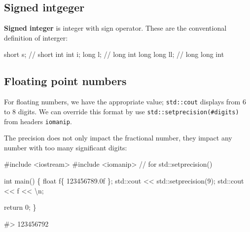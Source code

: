 \documentclass[
  letterpaper,
  DIV=11,
  numbers=noendperiod]{scrreprt}
\newenvironment{Shaded}{\begin{snugshade}}{\end{snugshade}}
\newcommand{\CommentTok}[1]{\textcolor[rgb]{0.37,0.37,0.37}{#1}}
\newcommand{\DecValTok}[1]{\textcolor[rgb]{0.68,0.00,0.00}{#1}}
\newcommand{\ErrorTok}[1]{\textcolor[rgb]{0.68,0.00,0.00}{#1}}
\newcommand{\FloatTok}[1]{\textcolor[rgb]{0.68,0.00,0.00}{#1}}
\newcommand{\FunctionTok}[1]{\textcolor[rgb]{0.28,0.35,0.67}{#1}}
\newcommand{\NormalTok}[1]{\textcolor[rgb]{0.00,0.23,0.31}{#1}}
\newcommand{\SpecialCharTok}[1]{\textcolor[rgb]{0.37,0.37,0.37}{#1}}
\newcommand{\StringTok}[1]{\textcolor[rgb]{0.13,0.47,0.30}{#1}}
\begin{document}
\hypertarget{signed-intgeger}{%
\subsection{Signed intgeger}\label{signed-intgeger}}

\textbf{Signed integer} is integer with sign operator. These are the
conventional definition of interger:

\begin{Shaded}
\begin{Highlighting}[]
\NormalTok{short s;            }\SpecialCharTok{/}\ErrorTok{/}\NormalTok{ short int}
\NormalTok{int i;}
\NormalTok{long l;           }\SpecialCharTok{/}\ErrorTok{/}\NormalTok{ long int}
\NormalTok{long long ll;     }\SpecialCharTok{/}\ErrorTok{/}\NormalTok{ long long int }
\end{Highlighting}
\end{Shaded}

\hypertarget{floating-point-numbers}{%
\subsection{Floating point numbers}\label{floating-point-numbers}}

For floating numbers, we have the appropriate value; \texttt{std::cout}
displays from 6 to 8 digits. We can override this format by use
\texttt{std::setprecision(\#digits)} from headers \texttt{iomanip}.

The precision does not only impact the fractional number, they impact
any number with too many significant digits:

\begin{Shaded}
\begin{Highlighting}[]
\CommentTok{\#include \textless{}iostream\textgreater{}}
\CommentTok{\#include \textless{}iomanip\textgreater{}      // for std::setprecision()}

\NormalTok{int }\FunctionTok{main}\NormalTok{()}
\NormalTok{\{}
\NormalTok{    float f\{ }\FloatTok{123456789.0}\NormalTok{f \};}
\NormalTok{    std}\SpecialCharTok{::}\NormalTok{cout }\SpecialCharTok{\textless{}}\ErrorTok{\textless{}}\NormalTok{ std}\SpecialCharTok{::}\FunctionTok{setprecision}\NormalTok{(}\DecValTok{9}\NormalTok{);}
\NormalTok{    std}\SpecialCharTok{::}\NormalTok{cout }\SpecialCharTok{\textless{}}\ErrorTok{\textless{}}\NormalTok{ f }\SpecialCharTok{\textless{}}\ErrorTok{\textless{}} \StringTok{\textquotesingle{}}\SpecialCharTok{\textbackslash{}n}\StringTok{\textquotesingle{}}\NormalTok{;}

\NormalTok{    return }\DecValTok{0}\NormalTok{;}
\NormalTok{\}}

\CommentTok{\#\textgreater{} 123456792}
\end{Highlighting}
\end{Shaded}
\end{document}

